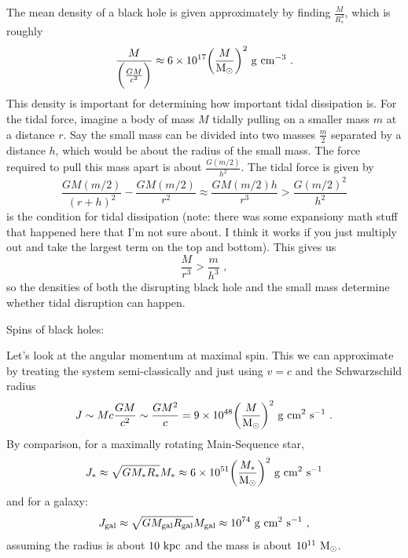 The mean density of a black hole is given approximately by finding $\frac{M}{R_s^3}$, which is roughly
\begin{equation}
\frac{M}{\biggl( \frac{GM}{c^2} \biggr)} \approx 6 \times 10^{17} \biggl(\frac{M}{{\rm M}_\odot} \biggr)^2~{\rm g}~{\rm cm}^{-3}\,\,.
\end{equation}
This density is important for determining how important tidal dissipation is. For the tidal force, imagine a body of mass $M$ tidally pulling on a smaller mass $m$ at a distance $r$. Say the small mass can be divided into two masses $\frac{m}{2}$ separated by a distance $h$, which would be about the radius of the small mass. The force required to pull this mass apart is about $\frac{G (m/2)}{h^2}$. The tidal force is given by
\begin{equation}
\frac{GM(m/2)}{(r + h)^2} - \frac{GM(m/2)}{r^2} \approx \frac{GM(m/2)h}{r^3} > \frac{G(m/2)^2}{h^2}
\end{equation}
is the condition for tidal dissipation (note: there was some expansiony math stuff that happened here that I'm not sure about. I think it works if you just multiply out and take the largest term on the top and bottom). This gives us
\begin{equation}
\frac{M}{r^3} > \frac{m}{h^3}\,\,,
\end{equation}
so the densities of both the disrupting black hole and the small mass determine whether tidal disruption can happen.

Spins of black holes:

Let's look at the angular momentum at maximal spin. This we can approximate by treating the system semi-classically and just using $v = c$ and the Schwarzschild radius
\begin{equation}
J \sim Mc \frac{GM}{c^2} \sim \frac{GM^2}{c} = 9 \times 10^{48} \biggl( \frac{M}{{\rm M}_\odot} \biggr)^2 ~{\rm g}~{\rm cm}^2~{\rm s}^{-1}\,\,.
\end{equation}
By comparison, for a maximally rotating Main-Sequence star,
\begin{equation}
J_* \approx \sqrt{G M_* R_*} M_* \approx 6 \times 10^{51}\biggl( \frac{M_*}{{\rm M}_\odot} \biggr)^2 ~{\rm g}~{\rm cm}^2~{\rm s}^{-1}
\end{equation}
and for a galaxy:
\begin{equation}
J_{\rm gal} \approx \sqrt{G M_{\rm gal} R_{\rm gal}} M_{\rm gal} \approx 10^{74}~{\rm g}~{\rm cm}^2~{\rm s}^{-1}\,\, ,
\end{equation}
assuming the radius is about $10~{\rm kpc}$ and the mass is about $10^{11}~\rm{M}_\odot$.

